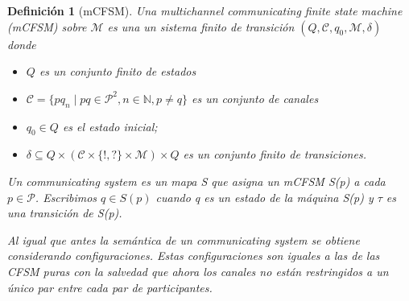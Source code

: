 \documentclass[paper=a4, fontsize=11pt, spanish]{scrartcl} %
\numberwithin{equation}{section} %
\numberwithin{figure}{section} %
\numberwithin{table}{section} %
\newtheorem{definition}{Definición}
\begin{document}

\begin{definition}[mCFSM] Una multichannel communicating finite state machine (mCFSM) sobre $\mathcal{M}$ es una un sistema finito de transición $(Q, \mathcal{C}, q_0, \mathcal{M}, \delta)$ donde
\begin{itemize}
  \item $Q$ es un conjunto finito de estados
  \item $\mathcal{C} = \{ pq_n \mid pq \in \mathcal{P}^2, n \in \mathbb{N}, p \not= q\}$ es un conjunto de canales
  \item $q_0 \in Q$ es el estado inicial;
  \item $\delta \subseteq Q \times (\mathcal{C} \times \{!,?\} \times \mathcal{M}) \times
    Q$ es un conjunto finito de \emph{transiciones}.
  \end{itemize}

Un communicating system es un mapa S que asigna un mCFSM S(p) a cada $p \in \mathcal{P}$. Escribimos $q \in S(p)$ cuando q es un estado de la máquina S(p) y $\tau$ es una transición de S(p).
  
Al igual que antes la semántica de un communicating system se obtiene considerando configuraciones. Estas configuraciones son iguales a las de las CFSM puras con la salvedad que ahora los canales no están restringidos a un único par entre cada par de participantes.

 \end{definition}
 

% 
% 
\end{document}
